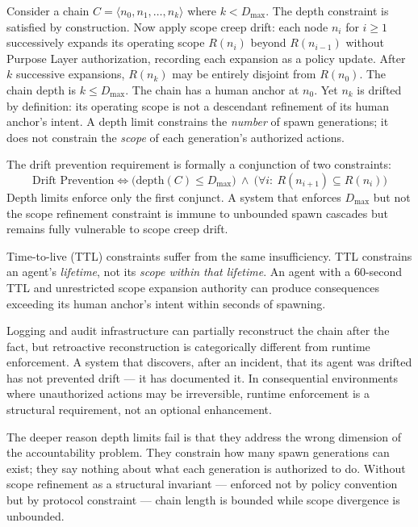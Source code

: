 Consider a chain $C = \langle n_0, n_1, \ldots, n_k \rangle$ where $k < D_{\max}$. The depth constraint is satisfied by construction. Now apply scope creep drift: each node $n_i$ for $i \geq 1$ successively expands its operating scope $R(n_i)$ beyond $R(n_{i-1})$ without Purpose Layer authorization, recording each expansion as a policy update. After $k$ successive expansions, $R(n_k)$ may be entirely disjoint from $R(n_0)$. The chain depth is $k \leq D_{\max}$. The chain has a human anchor at $n_0$. Yet $n_k$ is drifted by definition: its operating scope is not a descendant refinement of its human anchor's intent. A depth limit constrains the \emph{number} of spawn generations; it does not constrain the \emph{scope} of each generation's authorized actions.

The drift prevention requirement is formally a conjunction of two constraints:
\begin{equation}
\text{Drift Prevention} \iff \bigl(\text{depth}(C) \leq D_{\max}\bigr) \ \land \ \bigl(\forall i:\ R(n_{i+1}) \subseteq R(n_i)\bigr)
\label{eq:intro-drift-prevention}
\end{equation}
Depth limits enforce only the first conjunct. A system that enforces $D_{\max}$ but not the scope refinement constraint is immune to unbounded spawn cascades but remains fully vulnerable to scope creep drift.

Time-to-live (TTL) constraints suffer from the same insufficiency. TTL constrains an agent's \emph{lifetime}, not its \emph{scope within that lifetime}. An agent with a 60-second TTL and unrestricted scope expansion authority can produce consequences exceeding its human anchor's intent within seconds of spawning.

Logging and audit infrastructure can partially reconstruct the chain after the fact, but retroactive reconstruction is categorically different from runtime enforcement. A system that discovers, after an incident, that its agent was drifted has not prevented drift — it has documented it. In consequential environments where unauthorized actions may be irreversible, runtime enforcement is a structural requirement, not an optional enhancement.

The deeper reason depth limits fail is that they address the wrong dimension of the accountability problem. They constrain how many spawn generations can exist; they say nothing about what each generation is authorized to do. Without scope refinement as a structural invariant — enforced not by policy convention but by protocol constraint — chain length is bounded while scope divergence is unbounded.

